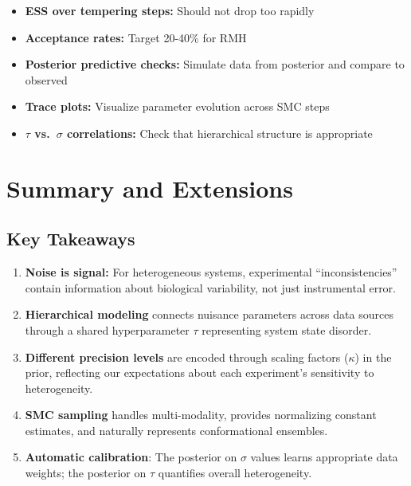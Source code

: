 \documentclass[11pt,a4paper]{article}
\theoremstyle{definition}
\begin{document}
\begin{itemize}
    \item \textbf{ESS over tempering steps:} Should not drop too rapidly
    \item \textbf{Acceptance rates:} Target 20-40\% for RMH
    \item \textbf{Posterior predictive checks:} Simulate data from posterior and compare to observed
    \item \textbf{Trace plots:} Visualize parameter evolution across SMC steps
    \item \textbf{$\tau$ vs.\ $\sigma$ correlations:} Check that hierarchical structure is appropriate
\end{itemize}

\section{Summary and Extensions}

\subsection{Key Takeaways}

\begin{enumerate}
    \item \textbf{Noise is signal:} For heterogeneous systems, experimental ``inconsistencies'' contain information about biological variability, not just instrumental error.
    
    \item \textbf{Hierarchical modeling} connects nuisance parameters across data sources through a shared hyperparameter $\tau$ representing system state disorder.
    
    \item \textbf{Different precision levels} are encoded through scaling factors ($\kappa$) in the prior, reflecting our expectations about each experiment's sensitivity to heterogeneity.
    
    \item \textbf{SMC sampling} handles multi-modality, provides normalizing constant estimates, and naturally represents conformational ensembles.
    
    \item \textbf{Automatic calibration}: The posterior on $\sigma$ values learns appropriate data weights; the posterior on $\tau$ quantifies overall heterogeneity.
\end{enumerate}
\end{document}
